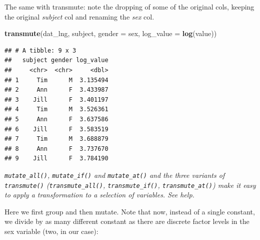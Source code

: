 \documentclass[]{book}
\newenvironment{Shaded}{\begin{snugshade}}{\end{snugshade}}
\newcommand{\KeywordTok}[1]{\textcolor[rgb]{0.13,0.29,0.53}{\textbf{#1}}}
\newcommand{\DataTypeTok}[1]{\textcolor[rgb]{0.13,0.29,0.53}{#1}}
\newcommand{\DecValTok}[1]{\textcolor[rgb]{0.00,0.00,0.81}{#1}}
\newcommand{\StringTok}[1]{\textcolor[rgb]{0.31,0.60,0.02}{#1}}
\newcommand{\OperatorTok}[1]{\textcolor[rgb]{0.81,0.36,0.00}{\textbf{#1}}}
\newcommand{\NormalTok}[1]{#1}
\begin{document}
The same with transmute: note the dropping of some of the original cols,
keeping the original \emph{subject} col and renaming the \emph{sex} col.

\begin{Shaded}
\begin{Highlighting}[]
\KeywordTok{transmute}\NormalTok{(dat_lng, subject, }\DataTypeTok{gender =}\NormalTok{ sex, }\DataTypeTok{log_value =} \KeywordTok{log}\NormalTok{(value))}
\end{Highlighting}
\end{Shaded}

\begin{verbatim}
## # A tibble: 9 x 3
##   subject gender log_value
##     <chr>  <chr>     <dbl>
## 1     Tim      M  3.135494
## 2     Ann      F  3.433987
## 3    Jill      F  3.401197
## 4     Tim      M  3.526361
## 5     Ann      F  3.637586
## 6    Jill      F  3.583519
## 7     Tim      M  3.688879
## 8     Ann      F  3.737670
## 9    Jill      F  3.784190
\end{verbatim}

\begin{Shaded}
\end{Shaded}

\emph{\texttt{mutate\_all()}, \texttt{mutate\_if()} and
\texttt{mutate\_at()} and the three variants of \texttt{transmute()}
(\texttt{transmute\_all()}, \texttt{transmute\_if()},
\texttt{transmute\_at()}) make it easy to apply a transformation to a
selection of variables. See help.}

Here we first group and then mutate. Note that now, instead of a single
constant, we divide by as many different constant as there are discrete
factor levels in the sex variable (two, in our case):
\end{document}

